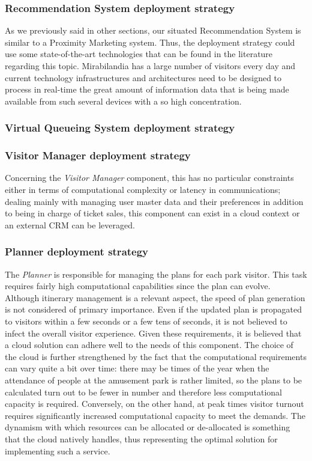 \subsubsection{Recommendation System deployment strategy}
As we previously said in other sections, our situated Recommendation System is similar to a Proximity Marketing system.
Thus, the deployment strategy could use some state-of-the-art technologies that can be found in the literature regarding this topic.
Mirabilandia has a large number of visitors every day and current technology infrastructures and architectures need to be designed to process in real-time the great amount of information data that is being made available from such several devices with a so high concentration.

\subsubsection{Virtual Queueing System deployment strategy}

\subsubsection{Visitor Manager deployment strategy}
Concerning the \textit{Visitor Manager} component, this has no particular constraints either in terms of computational complexity or latency in
communications; dealing mainly with managing user master data and their preferences in addition to being in charge of ticket sales, this component
can exist in a cloud context or an external CRM can be leveraged.

\subsubsection{Planner deployment strategy}
The \textit{Planner} is responsible for managing the plans for each park visitor. This task requires fairly high computational capabilities since the
plan can evolve. Although itinerary management is a relevant aspect, the speed of plan generation is not considered of primary importance. Even if
the updated plan is propagated to visitors within a few seconds or a few tens of seconds, it is not believed to infect the overall visitor
experience. Given these requirements, it is believed that a cloud solution can adhere well to the needs of this component. The choice of the cloud is
further strengthened by the fact that the computational requirements can vary quite a bit over time: there may be times of the year when the
attendance of people at the amusement park is rather limited, so the plans to be calculated turn out to be fewer in number and therefore less
computational capacity is required. Conversely, on the other hand, at peak times visitor turnout requires significantly increased computational
capacity to meet the demands. The dynamism with which resources can be allocated or de-allocated is something that the cloud natively handles, thus
representing the optimal solution for implementing such a service.

